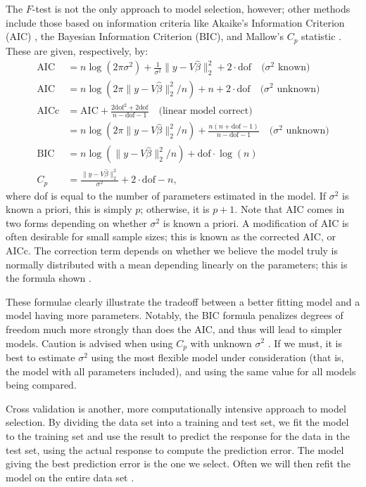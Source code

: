 \documentclass[12pt]{article}
\begin{document}
The $F$-test is not the only approach to model selection, however; other methods include those based on information criteria like Akaike's Information Criterion (AIC) \cite[\S~12.3.3]{Seber:2003}, the Bayesian Information Criterion (BIC), and Mallow's $C_p$ statistic \cite[\S~10.2.1]{Weisberg:2005}. These are given, respectively, by:
\begin{align*}
   \textrm{AIC} &= n \log (2 \pi \sigma^2) + \frac{1}{\sigma^2} \| y - V \hat{\beta} \|_2^2 + 2 \cdot \textrm{dof} \quad \textrm{($\sigma^2$ known)}\\
    \textrm{AIC} &= n \log (2 \pi \| y - V \hat{\beta} \|_2^2 / n) + n + 2 \cdot \textrm{dof} \quad \textrm{($\sigma^2$ unknown)} \\
     \textrm{AICc} &= \textrm{AIC} + \frac{2\textrm{dof}^2 + 2 \textrm{dof}}{n - \textrm{dof} - 1} \quad \textrm{(linear model correct)} \\
      &= n \log (2 \pi \| y - V \hat{\beta} \|_2^2 / n) + \frac{n(n + \textrm{dof} - 1) }{n - \textrm{dof} - 1} \quad \textrm{($\sigma^2$ unknown)} \\
   \textrm{BIC} &= n \log(\| y - V \hat{\beta} \|_2^2 / n) + \textrm{dof} \cdot \log(n) \\
   C_p &= \frac{\| y - V \hat{\beta} \|_2^2}{\sigma^2}  + 2 \cdot \textrm{dof} - n,
\end{align*}
where dof is equal to the number of parameters estimated in the model. If $\sigma^2$ is known a priori, this is simply $p$; otherwise, it is $p+1$. Note that AIC comes in two forms depending on whether $\sigma^2$ is known a priori. A modification of AIC is often desirable for small sample sizes; this is known as the corrected AIC, or AICc. The correction term depends on whether we believe the model truly is normally distributed with a mean depending linearly on the parameters; this is the formula shown \cite[\S~7.7.6]{Burnham:2002}.

These formulae clearly illustrate the tradeoff between a better fitting model and a model having more parameters. Notably, the BIC formula penalizes degrees of freedom much more strongly than does the AIC, and thus will lead to simpler models. Caution is advised when using $C_p$ with unknown $\sigma^2$ \cite[\S~1.8.6]{Wood:2017}. If we must, it is best to estimate $\sigma^2$ using the most flexible model under consideration (that is, the model with all parameters included), and using the same value for all models being compared.

Cross validation is another, more computationally intensive approach to model selection. By dividing the data set into a training and test set, we fit the model to the training set and use the result to predict the response for the data in the test set, using the actual response to compute the prediction error. The model giving the best prediction error is the one we select. Often we will then refit the model on the entire data set \cite[\S~7.10]{Hastie:2001}.
\end{document}
